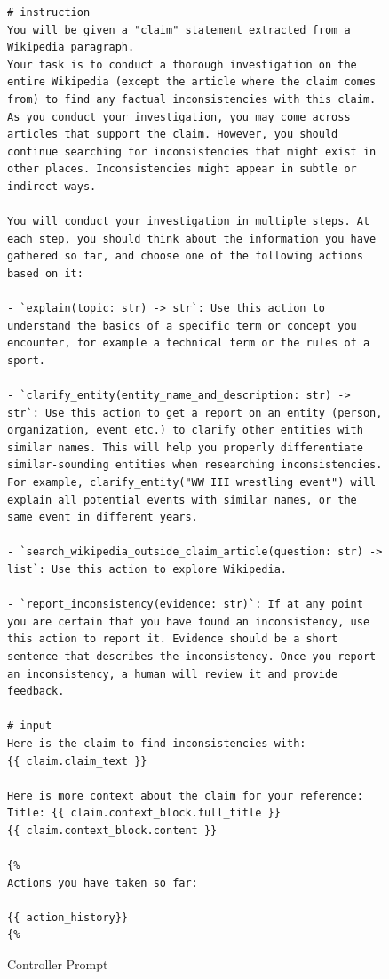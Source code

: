 \documentclass[11pt]{article}
\begin{document}
\begin{figure}[htb]
\begin{lstlisting}
# instruction
You will be given a "claim" statement extracted from a Wikipedia paragraph.
Your task is to conduct a thorough investigation on the entire Wikipedia (except the article where the claim comes from) to find any factual inconsistencies with this claim.
As you conduct your investigation, you may come across articles that support the claim. However, you should continue searching for inconsistencies that might exist in other places. Inconsistencies might appear in subtle or indirect ways.

You will conduct your investigation in multiple steps. At each step, you should think about the information you have gathered so far, and choose one of the following actions based on it:

- `explain(topic: str) -> str`: Use this action to understand the basics of a specific term or concept you encounter, for example a technical term or the rules of a sport.

- `clarify_entity(entity_name_and_description: str) -> str`: Use this action to get a report on an entity (person, organization, event etc.) to clarify other entities with similar names. This will help you properly differentiate similar-sounding entities when researching inconsistencies. For example, clarify_entity("WW III wrestling event") will explain all potential events with similar names, or the same event in different years.

- `search_wikipedia_outside_claim_article(question: str) -> list`: Use this action to explore Wikipedia.

- `report_inconsistency(evidence: str)`: If at any point you are certain that you have found an inconsistency, use this action to report it. Evidence should be a short sentence that describes the inconsistency. Once you report an inconsistency, a human will review it and provide feedback.

# input
Here is the claim to find inconsistencies with:
{{ claim.claim_text }}

Here is more context about the claim for your reference:
Title: {{ claim.context_block.full_title }}
{{ claim.context_block.content }}

{%
Actions you have taken so far:

{{ action_history}}
{%
\end{lstlisting}

\caption{Controller Prompt}
\label{lst:controller}
\end{figure}









































\end{document}
